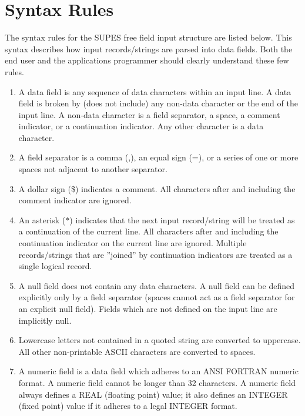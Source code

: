 \section{Syntax Rules} \label{sec:syntax}
The syntax rules for the SUPES free field input structure are listed below.
This syntax describes how input records/strings are parsed into data fields.  Both
the end user and the applications programmer should clearly understand these
few rules.
\begin{enumerate}
\item A data field is any sequence of data characters within an input line.  A
   data field is broken by (does not include) any non-data character or the
   end of the input line.  A non-data character is a field separator, a
   space, a comment indicator, or a continuation indicator.  Any other
   character is a data character.

\item A field separator is a comma (,), an equal sign (=), or a series of one
   or more spaces not adjacent to another separator.

\item A dollar sign (\$) indicates a comment.  All characters after and
   including the comment indicator are ignored.

\item An asterisk ($*$) indicates that the next input record/string will be
treated as a continuation of the current line.  All characters after and
including the continuation indicator on the current line are ignored.
Multiple records/strings that are ''joined'' by continuation indicators
are treated as a single logical record.

\item A null field does not contain any data characters.  A null field can be
   defined explicitly only by a field separator (spaces cannot act as a
   field separator for an explicit null field).  Fields which are not
   defined on the input line are implicitly null.

\item \label{itm:case} Lowercase letters not contained in a quoted string
                       are converted to uppercase.  All
                       other non-printable ASCII characters are converted
                       to spaces.

\item A numeric field is a data field which adheres to an ANSI FORTRAN numeric
   format.  A numeric field cannot be longer than 32 characters.  A numeric
   field always defines a REAL (floating point) value; it also defines an
   INTEGER (fixed point) value if it adheres to a legal INTEGER format.


\end{enumerate}

